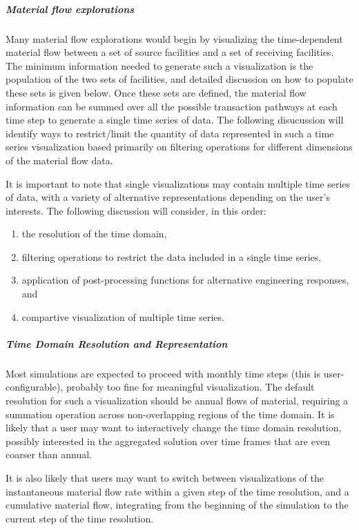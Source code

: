 \documentclass[letterpaper,10pt,english]{sphinxmanual}
\begin{document}
\subparagraph{Material flow explorations}
\label{devdoc/output_usecases:material-flow-explorations}
Many material flow explorations would begin by visualizing the
time-dependent material flow between a set of source facilities and a
set of receiving facilities.  The minimum information needed to
generate such a visualization is the population of the two sets of
facilities, and detailed discussion on how to populate these sets is
given below.  Once these sets are defined, the material flow
information can be summed over all the possible transaction pathways
at each time step to generate a single time series of data.  The
following disucussion will identify ways to restrict/limit the
quantity of data represented in such a time series visualization based
primarily on filtering operations for different dimensions of the
material flow data.

It is important to note that single visualizations may contain
multiple time series of data, with a variety of alternative
representations depending on the user's interests.  The following
discussion will consider, in this order:
\begin{enumerate}
\item {} 
the resolution of the time domain,

\item {} 
filtering operations to restrict the data included in a single time series,

\item {} 
application of post-processing functions for alternative engineering responses, and

\item {} 
compartive visualization of multiple time series.

\end{enumerate}


\subparagraph{Time Domain Resolution and Representation}
\label{devdoc/output_usecases:time-domain-resolution-and-representation}
Most simulations are expected to proceed with monthly time steps (this
is user-configurable), probably too fine for meaningful visualization.
The default resolution for such a visualization should be annual flows
of material, requiring a summation operation across non-overlapping
regions of the time domain.  It is likely that a user may want to
interactively change the time domain resolution, possibly interested
in the aggregated solution over time frames that are even coarser than
annual.

It is also likely that users may want to switch between visualizations
of the instantaneous material flow rate within a given step of the
time resolution, and a cumulative material flow, integrating from the
beginning of the simulation to the current step of the time
resolution.
\end{document}
